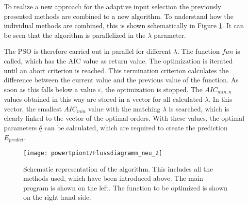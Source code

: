 To realize a new approach for the adaptive input selection the previously presented methods are combined to a new algorithm. To understand how the individual methods are combined, this is shown schematically in Figure \ref{fig:flowchart}. It can be seen that the algorithm is parallelized in the $\lambda$ parameter.

The PSO is therefore carried out in parallel for different $\lambda$. The function $fun$ is called, which has the AIC value as return value. The optimization is iterated until an abort criterion is reached. This termination criterion calculates the difference between the current value and the previous value of the function. As soon as this falls below a value $\varepsilon$, the optimization is stopped. The $AIC_{min,n}$ values obtained in this way are stored in a vector for all calculated $\lambda$. In this vector, the smallest $AIC_{min}$ value with the matching $\lambda$ is searched, which is clearly linked to the vector of the optimal orders. With these values, the optimal parameters $\underline{\theta}$ can be calculated, which are required to create the prediction $E_{predict}$.




\begin{figure}[!htb]
    \centering
    \texttt{[image: powertpiont/Flussdiagramm\_neu\_2]} %
    \caption[Scheme of the algorithm]{Schematic representation of the algorithm. This includes all the methods used, which have been introduced above. The main program is shown on the left. The function to be optimized is shown on the right-hand side.}
    \label{fig:flowchart}
\end{figure}




 


